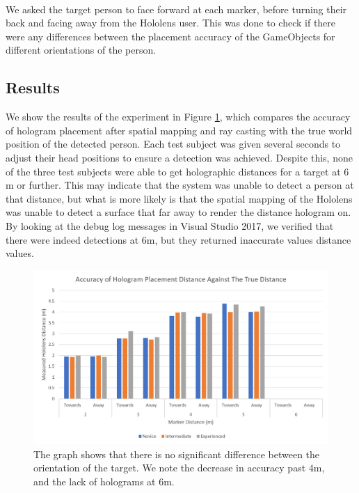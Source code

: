\paragraph{} We asked the target person to face forward at each marker, before turning their back and facing away from the Hololens user. This was done to check if there were any differences between the placement accuracy of the GameObjects for different orientations of the person.

\subsection{Results}
We show the results of the experiment in Figure \ref{fig:hddResults}, which compares the accuracy of hologram placement after spatial mapping and ray casting with the true world position of the detected person. Each test subject was given several seconds to adjust their head positions to ensure a detection was achieved. Despite this, none of the three test subjects were able to get holographic distances for a target at $6$m or further. This may indicate that the system was unable to detect a person at that distance, but what is more likely  is that the spatial mapping of the Hololens was unable to detect a surface that far away to render the distance hologram on. By looking at the debug log messages in Visual Studio 2017, we verified that there were indeed detections at $6$m, but they returned inaccurate values distance values.

\begin{figure}[ht]
	\centering
	\includegraphics[width=1.0\linewidth]{img/chapter6_test/hddtestresults.png}
	\caption{The graph shows that there is no significant difference between the orientation of the target. We note the decrease in accuracy past $4$m, and the lack of holograms at $6$m.}
	\label{fig:hddResults}
\end{figure}

